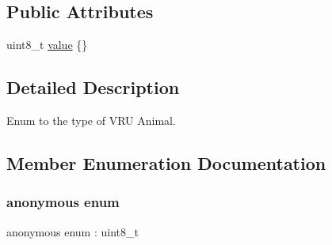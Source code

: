 \subsection*{Public Attributes}
\begin{DoxyCompactItemize}
\item 
uint8\+\_\+t \hyperlink{structmaf__perception__interface_1_1VRUAniSubTypeEnum_ad487a0bd873e1d078769e0ae877ac293}{value} \{\}
\end{DoxyCompactItemize}


\subsection{Detailed Description}
Enum to the type of V\+RU Animal. 

\subsection{Member Enumeration Documentation}
\mbox{\label{structmaf__perception__interface_1_1VRUAniSubTypeEnum_ac8a6e5537298662359295f3ab633e5da}} 
\subsubsection{\texorpdfstring{anonymous enum}{anonymous enum}}
{\footnotesize\ttfamily anonymous enum \+: uint8\+\_\+t}

